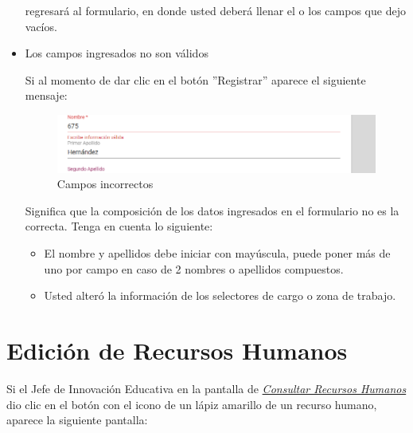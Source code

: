\begin{itemize}
                         regresará al formulario, en donde usted deberá llenar el o los campos que dejo vacíos.

                    \item Los campos ingresados no son válidos

                        Si al momento de dar clic en el botón ''Registrar'' aparece el siguiente mensaje:
                         \begin{figure}[H]
                            \centering
                            \includegraphics[width=0.4\linewidth]{images/SP1/MSG35}
                            \caption{Campos incorrectos}
                            \label{mensaje35}

                        \end{figure}

                        Significa que la composición de los datos ingresados en el formulario no es la correcta. Tenga en cuenta lo siguiente:

                        \begin{itemize}
                            \item El nombre y apellidos debe iniciar con mayúscula, puede poner más de uno por campo en caso de 2 nombres o apellidos compuestos.
                            \item Usted alteró la información de los selectores de cargo o zona de trabajo.
                        \end{itemize}

                \end{itemize}

\newpage

            \hypertarget{editar-RH}{}
            \section{Edición de Recursos Humanos}
                Si el Jefe de Innovación Educativa en la pantalla de \hyperlink{consultarRH}{\textit{Consultar Recursos Humanos}} dio clic en el botón con el icono de un lápiz amarillo de un recurso humano, aparece la siguiente pantalla:

